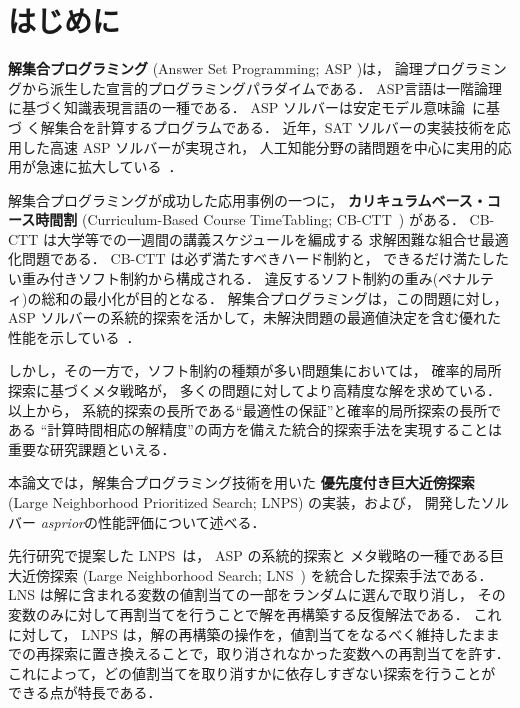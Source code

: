 \chapter{はじめに}


\textbf{解集合プログラミング}
(Answer Set Programming; ASP
\cite{%
  baral03:cambridge,%
  DBLP:conf/iclp/GelfondL88,%
  DBLP:journals/amai/Niemela99})は，
論理プログラミングから派生した宣言的プログラミングパラダイムである．
ASP言語は一階論理に基づく知識表現言語の一種である．
ASP ソルバーは安定モデル意味論~\cite{DBLP:conf/iclp/GelfondL88}に基づ
く解集合を計算するプログラムである．
近年，SAT ソルバーの実装技術を応用した高速 ASP ソルバーが実現され，
人工知能分野の諸問題を中心に実用的応用が急速に拡大している~\cite{ergele16a}．

解集合プログラミングが成功した応用事例の一つに，
\textbf{カリキュラムベース・コース時間割}
(Curriculum-Based Course TimeTabling; CB-CTT~\cite{DBLP:journals/anor/BonuttiCGS12})
がある．
CB-CTT は大学等での一週間の講義スケジュールを編成する
求解困難な組合せ最適化問題である．
CB-CTT は必ず満たすべきハード制約と，
できるだけ満たしたい重み付きソフト制約から構成される．
違反するソフト制約の重み(ペナルティ)の総和の最小化が目的となる．
解集合プログラミングは，この問題に対し，
ASP ソルバーの系統的探索を活かして，未解決問題の最適値決定を含む優れた
性能を示している~\cite{anor/Banbara2019}．

しかし，その一方で，ソフト制約の種類が多い問題集においては，
確率的局所探索に基づくメタ戦略が，
多くの問題に対してより高精度な解を求めている．
以上から，
系統的探索の長所である``最適性の保証''と確率的局所探索の長所である
``計算時間相応の解精度''の両方を備えた統合的探索手法を実現することは
重要な研究課題といえる．

本論文では，解集合プログラミング技術を用いた
\textbf{優先度付き巨大近傍探索}
(Large Neighborhood Prioritized Search; LNPS)
の実装，および，
開発したソルバー \textit{asprior}の性能評価について述べる．

先行研究で提案した LNPS~\cite{jsai2021:kutaba}は，
ASP の系統的探索と
メタ戦略の一種である巨大近傍探索
(Large Neighborhood Search; LNS~\cite{Pisinger10})
を統合した探索手法である．
%
LNS は解に含まれる変数の値割当ての一部をランダムに選んで取り消し，
その変数のみに対して再割当てを行うことで解を再構築する反復解法である．
これに対して，
LNPS は，解の再構築の操作を，値割当てをなるべく維持したまま
での再探索に置き換えることで，取り消されなかった変数への再割当てを許す．
これによって，どの値割当てを取り消すかに依存しすぎない探索を行うことが
できる点が特長である．

